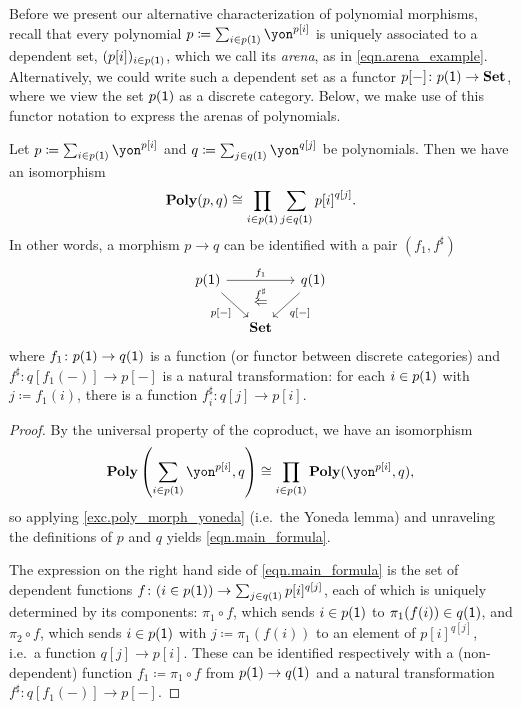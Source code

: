 \documentclass[Book-Poly]{subfiles}
\begin{document}
Before we present our alternative characterization of polynomial morphisms, recall that every polynomial $p \coloneqq \sum_{i \in p(\1)} \yon^{p[i]}$ is uniquely associated to a dependent set, $(p[i])_{i \in p(\textsf{1})}$, which we call its \emph{arena}, as in \eqref{eqn.arena_example}.
Alternatively, we could write such a dependent set as a functor $p[-] \colon p(\textsf{1}) \to \mathbf{Set}$, where we view the set $p(\textsf{1})$ as a discrete category.
Below, we make use of this functor notation to express the arenas of polynomials.

\begin{proposition}\label{prop.poly_maps_prod_sum}
Let $p\coloneqq\sum_{i\in p(\1)}\yon^{p[i]}$ and $q\coloneqq\sum_{j\in q(\1)}\yon^{q[j]}$ be polynomials.
Then we have an isomorphism
\begin{equation}\label{eqn.main_formula}
\mathbf{Poly}(p,q)\cong\prod_{i\in p(\textsf{1})}\sum_{j\in q(\textsf{1})}{p[i]}^{q[j]}.
\end{equation}
In other words, a morphism $p\to q$ can be identified with a pair $(f_1,f^\sharp)$
\begin{equation}\label{eqn.colax_poly_map}
\begin{tikzcd}[column sep=small]
	p(\1)\ar[dr, "p{[-]}"']\ar[rr, "f_1"]&~&
	q(\1)\ar[dl, "q{[-]}"]\\&
	\smset\ar[u, phantom, near end, "\overset{f^\sharp}{\Leftarrow}"]
\end{tikzcd}
\end{equation}
where $f_1 \colon p(\textsf{1}) \to q(\textsf{1})$ is a function (or functor between discrete categories) and $f^\sharp \colon q[f_1(-)] \to p[-]$ is a natural transformation: for each $i\in p(\textsf{1})$ with $j\coloneqq f_1(i)$, there is a function $f^\sharp_i\colon q[j]\to p[i]$. %
\end{proposition}
\begin{proof}
By the universal property of the coproduct, we have an isomorphism
\[
    \poly\left(\sum_{i \in p(\1)}\yon^{p[i]}, q\right) \iso \prod_{i \in p(\1)} \poly(\yon^{p[i]}, q),
\]
so applying \cref{exc.poly_morph_yoneda} (i.e.\ the Yoneda lemma) and unraveling the definitions of $p$ and $q$ yields \eqref{eqn.main_formula}.

The expression on the right hand side of \eqref{eqn.main_formula} is the set of dependent functions $f \colon (i \in p(\textsf{1})) \to \sum_{j \in q(\textsf{1})} p[i]^{q[j]}$, each of which is uniquely determined by its components: $\pi_1 \circ f$, which sends $i \in p(\textsf{1})$ to $\pi_1(f(i)) \in q(\textsf{1})$, and $\pi_2 \circ f$, which sends $i \in p(\textsf{1})$ with $j \coloneqq \pi_1(f(i))$ to an element of $p[i]^{q[j]}$, i.e.\ a function $q[j] \to p[i]$.
These can be identified respectively with a (non-dependent) function $f_1 \coloneqq \pi_1 \circ f$ from $p(\textsf{1}) \to q(\textsf{1})$ and a natural transformation $f^\sharp \colon q[f_1(-)] \to p[-]$.
\end{proof}
\end{document}
